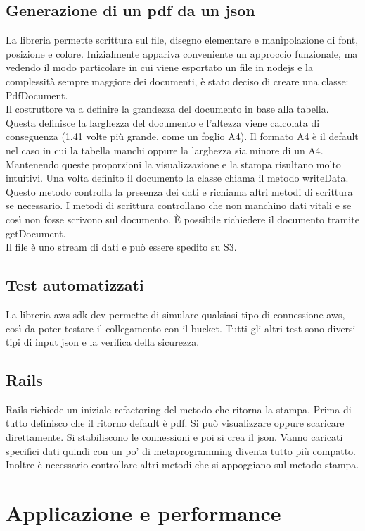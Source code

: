\documentclass[12pt]{article}
\begin{document}
\subsection{Generazione di un pdf da un json}
La libreria permette scrittura sul file, disegno elementare e manipolazione di 
font, posizione e colore.
Inizialmente appariva conveniente un approccio funzionale, ma vedendo il modo 
particolare in cui viene esportato un file in nodejs e la complessità sempre 
maggiore dei documenti, è stato deciso di creare una classe: PdfDocument. 
\\
Il costruttore va a definire la grandezza del documento in base alla tabella.
Questa definisce la larghezza del documento e l'altezza viene calcolata di
conseguenza (1.41 volte più grande, come un foglio A4).
Il formato A4 è il default nel caso in cui la tabella manchi oppure la larghezza 
sia minore di un A4. 
Mantenendo queste proporzioni la visualizzazione e la stampa risultano molto 
intuitivi. 
Una volta definito il documento la classe chiama il metodo writeData. 
Questo metodo controlla la presenza dei dati e richiama altri metodi di scrittura 
se necessario.
I metodi di scrittura controllano che non manchino dati vitali e se così non fosse 
scrivono sul documento. 
È possibile richiedere il documento tramite getDocument. 
\\ 
Il file è uno stream di dati e può essere spedito su S3. 

\subsection{Test automatizzati}
La libreria aws-sdk-dev permette di simulare qualsiasi tipo di connessione aws, 
così da poter testare il collegamento con il bucket. 
Tutti gli altri test sono diversi tipi di input json e la verifica della sicurezza.

\subsection{Rails}
Rails richiede un iniziale refactoring del metodo che ritorna la stampa. Prima di 
tutto definisco che il ritorno default è pdf. Si può visualizzare oppure scaricare 
direttamente. Si stabiliscono le connessioni e poi si crea il json. Vanno caricati 
specifici dati quindi con un po' di metaprogramming diventa tutto più compatto. 
Inoltre è necessario controllare altri metodi che si appoggiano sul metodo stampa. 

\section{Applicazione e performance}
\end{document}
